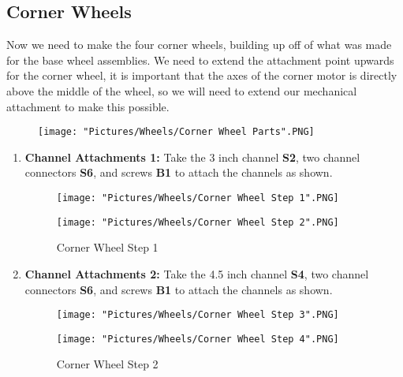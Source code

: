 \documentclass[12pt]{article}
\begin{document}
\subsection{Corner Wheels}
Now we need to make the four corner wheels, building up off of what was made for the base wheel assemblies. We need to extend the attachment point upwards for the corner wheel, it is important that the axes of the corner motor is directly above the middle of the wheel, so we will need to extend our mechanical attachment to make this possible.

\begin{figure}[H]
	\centering
	\texttt{[image: "Pictures/Wheels/Corner Wheel Parts".PNG]}
\end{figure}


\begin{enumerate}
\item \textbf{Channel Attachments 1:} Take the 3 inch channel \textbf{S2}, two channel connectors \textbf{S6}, and screws \textbf{B1} to attach the channels as shown.

\begin{figure}[H]
  \centering
  \begin{minipage}[b]{0.45\textwidth}
    \texttt{[image: "Pictures/Wheels/Corner Wheel Step 1".PNG]}
  \end{minipage}
  \hfill
  \begin{minipage}[b]{0.45\textwidth}
    \texttt{[image: "Pictures/Wheels/Corner Wheel Step 2".PNG]}
  \end{minipage}
  \caption{Corner Wheel Step 1}
\end{figure}

\item \textbf{Channel Attachments 2:} Take the 4.5 inch channel \textbf{S4}, two channel connectors \textbf{S6}, and screws \textbf{B1} to attach the channels as shown.

\begin{figure}[H]
  \centering
  \begin{minipage}[b]{0.45\textwidth}
    \texttt{[image: "Pictures/Wheels/Corner Wheel Step 3".PNG]}
  \end{minipage}
  \hfill
  \begin{minipage}[b]{0.45\textwidth}
    \texttt{[image: "Pictures/Wheels/Corner Wheel Step 4".PNG]}
  \end{minipage}
  \caption{Corner Wheel Step 2}
\end{figure}


\end{enumerate}
\end{document}
